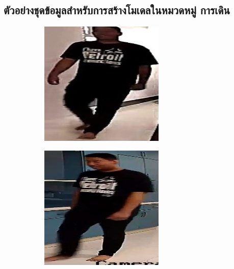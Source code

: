 \clearpage
\subsection*{ตัวอย่างชุดข้อมูลสำหรับการสร้างโมเดลในหมวดหมู่ การเดิน}
\begin{figure}[!ht]
    \centering
    \begin{subfigure}[b]{0.45\linewidth}
      \includegraphics[width=\linewidth]{appendix/walk/000_CXS0_D0_000568.jpg}
    \end{subfigure}
    \begin{subfigure}[b]{0.45\linewidth}
      \includegraphics[width=\linewidth]{appendix/walk/000_CXS0_D0_0005656.jpg}

\end{subfigure}
\end{figure}
